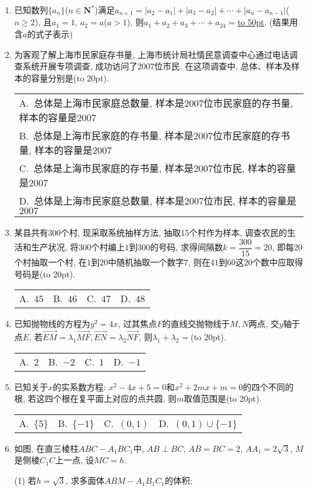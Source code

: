 \documentclass[10pt,a4paper]{article}
\newcommand{\blank}[1]{\underline{\hbox to #1pt{}}}
\newcommand{\bracket}[1]{(\hbox to #1pt{})}
\newcommand{\onech}[4]{\par\begin{tabular}{p{.9\textwidth}}
A.~#1\\
B.~#2\\
C.~#3\\
D.~#4
\end{tabular}}
\newcommand{\fourch}[4]{\par\begin{tabular}{p{.23\textwidth}p{.23\textwidth}p{.23\textwidth}p{.23\textwidth}}
A.~#1 &B.~#2& C.~#3& D.~#4
\end{tabular}}
\begin{document}
\begin{enumerate}[1.]
\item 已知数列$\{a_n\}$($n\in \mathbf{N}^*$)满足$a_{n+1}=|a_2-a_1|+|a_3-a_2|+\cdots +|a_n-a_{n-1}|$($n\ge 2$), 且$a_1=1$, $a_2=a$($a>1$), 则$a_1+a_2+a_3+\cdots +a_{24}=$\blank{50}. (结果用含$a$的式子表示)
\item 为客观了解上海市民家庭存书量, 上海市统计局社情民意调查中心通过电话调查系统开展专项调查, 成功访问了$2007$位市民. 在这项调查中, 总体、样本及样本的容量分别是\bracket{20}.
\onech{总体是上海市民家庭总数量, 样本是$2007$位市民家庭的存书量, 样本的容量是$2007$}{总体是上海市民家庭的存书量, 样本是$2007$位市民家庭的存书量, 样本的容量是$2007$}{总体是上海市民家庭的存书量, 样本是$2007$位市民, 样本的容量是$2007$}{总体是上海市民家庭总数量, 样本是$2007$位市民, 样本的容量是$2007$}
\item 某县共有$300$个村, 现采取系统抽样方法, 抽取15个村作为样本, 调查农民的生活和生产状况, 将$300$个村编上$1$到$300$的号码, 求得间隔数$k=\dfrac{300}{15}=20$, 即每$20$个村抽取一个村, 在$1$到$20$中随机抽取一个数字$7$, 则在$41$到$60$这$20$个数中应取得号码是\bracket{20}.
\fourch{$45$}{$46$}{$47$}{$48$}
\item 已知抛物线的方程为$y^2=4x$, 过其焦点$F$的直线交抛物线于$M,N$两点, 交$y$轴于点$E$, 若$\overrightarrow{EM}=\lambda _1\overrightarrow{MF},\overrightarrow{EN}=\lambda _2\overrightarrow{NF}$, 则$\lambda _1+\lambda _2=$\bracket{20}.
\fourch{$2$}{$-2$}{$1$}{$-1$}
\item 已知关于$x$的实系数方程: $x^2-4x+5=0$和$x^2+2mx+m=0$的四个不同的根, 若这四个根在复平面上对应的点共圆, 则$m$取值范围是\bracket{20}.
\fourch{$\{5\}$}{$\{-1\}$}{$(0,1)$}{$(0,1)\cup \{-1\}$}
\item 如图, 在直三棱柱$ABC-A_1BC_1$中, $AB\perp BC$, $AB=BC=2$, $AA_1=2\sqrt 3$, $M$是侧棱$C_1C$上一点, 设$MC=h$.
\begin{center}
\end{center}
(1) 若$h=\sqrt 3$, 求多面体$ABM-A_1B_1C_1$的体积;\\

\end{enumerate}
\end{document}
